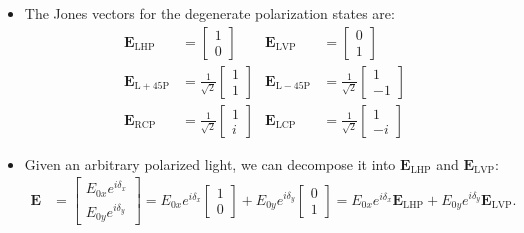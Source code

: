 \documentclass[10pt]{article}
\newcommand{\ve}[1]{\mathbf{#1}}
\begin{document}
\begin{itemize}
		\item The Jones vectors for the degenerate polarization states are:
		\begin{align*}
			\mathbf{E}_{\mathrm{LHP}} &= \begin{bmatrix}
				1 \\ 0
			\end{bmatrix} &
			\mathbf{E}_{\mathrm{LVP}} &= \begin{bmatrix}
				0 \\ 1
			\end{bmatrix} \\
			\mathbf{E}_{\mathrm{L+45P}} &= \frac{1}{\sqrt{2}} \begin{bmatrix}
				1 \\ 1
			\end{bmatrix} &
			\mathbf{E}_{\mathrm{L-45P}} &= \frac{1}{\sqrt{2}} \begin{bmatrix}
				1 \\ -1
			\end{bmatrix} \\
			\mathbf{E}_{\mathrm{RCP}} &= \frac{1}{\sqrt{2}} \begin{bmatrix}
				1 \\ i
			\end{bmatrix} &
			\mathbf{E}_{\mathrm{LCP}} &= \frac{1}{\sqrt{2}} \begin{bmatrix}
				1 \\ -i
			\end{bmatrix}
		\end{align*}

		\item Given an arbitrary polarized light, we can decompose it into $\mathbf{E}_{\mathrm{LHP}}$ and $\mathbf{E}_{\mathrm{LVP}}$:
		\begin{align*}
			\mathbf{E} 
			&= \begin{bmatrix}
				E_{0x} e^{i\delta_x} \\
				E_{0y} e^{i\delta_y}
			\end{bmatrix}
			= E_{0x} e^{i\delta_x} \begin{bmatrix} 1 \\ 0 \end{bmatrix}
			+ E_{0y} e^{i\delta_y} \begin{bmatrix} 0 \\ 1 \end{bmatrix}
			= E_{0x} e^{i\delta_x} \ve{E}_{\mathrm{LHP}}
			+ E_{0y} e^{i\delta_y} \ve{E}_{\mathrm{LVP}}.
		\end{align*}		


\end{itemize}
\end{document}
